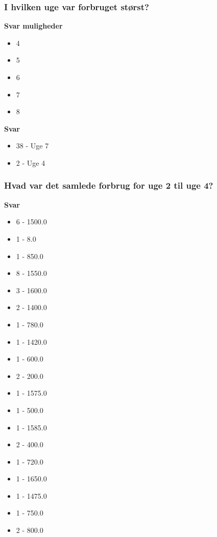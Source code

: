 \subsubsection{I hvilken uge var forbruget størst?}
\textbf{Svar muligheder}
\begin{itemize}
    \item 4
    \item 5
    \item 6
    \item 7
    \item 8
\end{itemize}

\textbf{Svar}
\begin{itemize}
    \item 38 - Uge 7
    \item 2 - Uge 4
\end{itemize}

\subsubsection{Hvad var det samlede forbrug for uge 2 til uge 4?}
\textbf{Svar}
\begin{itemize}
    \item 6 - 1500.0
    \item 1 - 8.0
    \item 1 - 850.0
    \item 8 - 1550.0
    \item 3 - 1600.0
    \item 2 - 1400.0
    \item 1 - 780.0
    \item 1 - 1420.0
    \item 1 - 600.0
    \item 2 - 200.0
    \item 1 - 1575.0
    \item 1 - 500.0
    \item 1 - 1585.0
    \item 2 - 400.0
    \item 1 - 720.0
    \item 1 - 1650.0
    \item 1 - 1475.0
    \item 1 - 750.0
    \item 2 - 800.0
\end{itemize}

